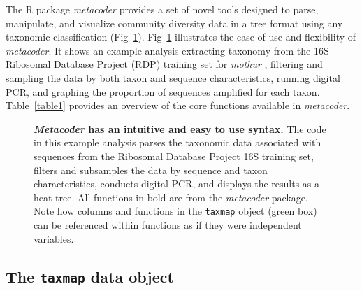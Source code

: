 \documentclass[10pt,letterpaper]{article}
\begin{document}
The R package \emph{metacoder} provides a set of novel tools designed to
parse, manipulate, and visualize community diversity data in a tree
format using any taxonomic classification (Fig~\ref{fig1}). Fig~\ref{fig1}
illustrates the ease of use and flexibility of \emph{metacoder}. It
shows an example analysis extracting taxonomy from the 16S Ribosomal
Database Project (RDP) training set for \emph{mothur}
\cite{schloss2009introducing}, filtering and sampling the data by both
taxon and sequence characteristics, running digital PCR, and graphing
the proportion of sequences amplified for each taxon. Table~\ref{table1} provides
an overview of the core functions available in \emph{metacoder}.


\begin{figure}[!h]
\caption{{\bf \emph{Metacoder} has an intuitive and easy to use
		syntax.}
The code in this example analysis parses the taxonomic data
associated with sequences from the Ribosomal Database Project
\cite{maidak1996ribosomal} 16S training set, filters and subsamples the
data by sequence and taxon characteristics, conducts digital PCR, and
displays the results as a heat tree. All functions in bold are from the
\emph{metacoder} package. Note how columns and functions in the
\texttt{taxmap} object (green box) can be referenced within functions as
if they were independent variables.}
\label{fig1}
\end{figure}


\subsection*{\texorpdfstring{The \texttt{taxmap} data
		object}{The taxmap data object}}\label{the-taxmap-data-object}
\end{document}
